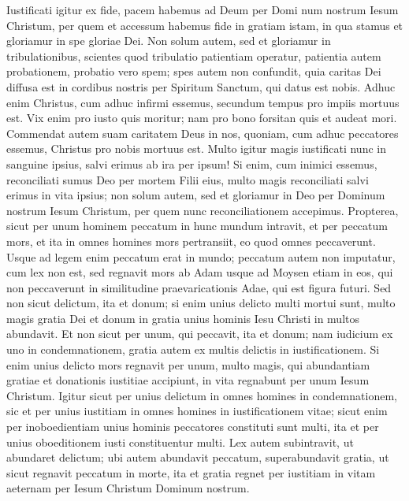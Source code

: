 \begin{biblechapter}
\begin{biblechapter}
\begin{biblechapter}
\begin{biblechapter}
\begin{biblechapter}
\verse Iustificati igitur ex fide, pacem habemus ad Deum per Domi num nostrum Iesum Christum, 
\verse per quem et accessum habemus fide in gratiam istam, in qua stamus et gloriamur in spe gloriae Dei. 
\verse Non solum autem, sed et gloriamur in tribulationibus, scientes quod tribulatio patientiam operatur, 
\verse patientia autem probationem, probatio vero spem; 
\verse spes autem non confundit, quia caritas Dei diffusa est in cordibus nostris per Spiritum Sanctum, qui datus est nobis.
 \verse Adhuc enim Christus, cum adhuc infirmi essemus, secundum tempus pro impiis mortuus est. 
\verse Vix enim pro iusto quis moritur; nam pro bono forsitan quis et audeat mori. 
\verse Commendat autem suam caritatem Deus in nos, quoniam, cum adhuc peccatores essemus, Christus pro nobis mortuus est. 
\verse Multo igitur magis iustificati nunc in sanguine ipsius, salvi erimus ab ira per ipsum! 
\verse Si enim, cum inimici essemus, reconciliati sumus Deo per mortem Filii eius, multo magis reconciliati salvi erimus in vita ipsius; 
\verse non solum autem, sed et gloriamur in Deo per Dominum nostrum Iesum Christum, per quem nunc reconciliationem accepimus.
 \verse Propterea, sicut per unum hominem peccatum in hunc mundum intravit, et per peccatum mors, et ita in omnes homines mors pertransiit, eo quod omnes peccaverunt. 
\verse Usque ad legem enim peccatum erat in mundo; peccatum autem non imputatur, cum lex non est, 
\verse sed regnavit mors ab Adam usque ad Moysen etiam in eos, qui non peccaverunt in similitudine praevaricationis Adae, qui est figura futuri.
 \verse Sed non sicut delictum, ita et donum; si enim unius delicto multi mortui sunt, multo magis gratia Dei et donum in gratia unius hominis Iesu Christi in multos abundavit. 
\verse Et non sicut per unum, qui peccavit, ita et donum; nam iudicium ex uno in condemnationem, gratia autem ex multis delictis in iustificationem. 
\verse Si enim unius delicto mors regnavit per unum, multo magis, qui abundantiam gratiae et donationis iustitiae accipiunt, in vita regnabunt per unum Iesum Christum.
 \verse Igitur sicut per unius delictum in omnes homines in condemnationem, sic et per unius iustitiam in omnes homines in iustificationem vitae; 
\verse sicut enim per inoboedientiam unius hominis peccatores constituti sunt multi, ita et per unius oboeditionem iusti constituentur multi.
 \verse Lex autem subintravit, ut abundaret delictum; ubi autem abundavit peccatum, superabundavit gratia, 
\verse ut sicut regnavit peccatum in morte, ita et gratia regnet per iustitiam in vitam aeternam per Iesum Christum Dominum nostrum.
 

\end{biblechapter}
\end{biblechapter}
\end{biblechapter}
\end{biblechapter}
\end{biblechapter}
